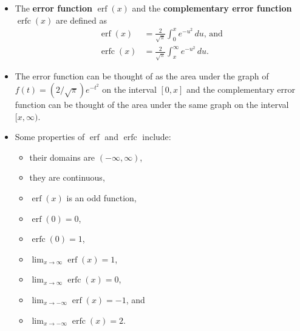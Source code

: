 \documentclass{article}
\DeclareMathOperator{\erf}{erf}
\DeclareMathOperator{\erfc}{erfc}
\begin{document}
\begin{itemize}
  \item The \textbf{error function} $\erf(x)$ and the \textbf{complementary error function} $\erfc(x)$ are defined as \begin{align*}
          \erf(x)  & = \frac{2}{\sqrt{\pi}} \int_0^x e^{-u^2} \,du \text{, and} \\
          \erfc(x) & = \frac{2}{\sqrt{\pi}} \int_x^\infty e^{-u^2} \,d u.
        \end{align*}

  \item The error function can be thought of as the area under the graph of $f(t) = (2 / \sqrt{\pi}) e^{-t^2}$ on the interval $[0, x]$ and the complementary error function can be thought of the area under the same graph on the interval $[x, \infty)$.

  \item Some properties of $\erf$ and $\erfc$ include:

        \begin{itemize}
          \item their domains are $(-\infty, \infty)$,

          \item they are continuous,

          \item $\erf(x)$ is an odd function,

          \item $\erf(0) = 0$,

          \item $\erfc(0) = 1$,

          \item $\lim_{x \rightarrow \infty} \erf(x) = 1$,

          \item $\lim_{x \rightarrow \infty} \erfc(x) = 0$,

          \item $\lim_{x \rightarrow -\infty} \erf(x) = -1$, and

          \item $\lim_{x \rightarrow -\infty} \erfc(x) = 2$.
        \end{itemize}
\end{itemize}
\end{document}
